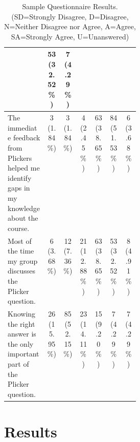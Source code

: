 \documentclass[12pt]{article}
\begin{document}
\begin{table}[ht]
\begin{tabular}{p{0.30\linewidth} |c|c|c|c|c|c}
& \specialcell{  53 \\(32.52\%)  }
& \specialcell{  7 \\(4.29\%)}\\\midrule 
\rowcolor{LightGray}%
The immediate feedback from Plickers helped me identify gaps in my knowledge about the course. 
& \specialcell{3 \\(1.84\%) }
& \specialcell{  3 \\(1.84\%)  }
& \specialcell{  4 \\(2.45\%)  }
& \specialcell{  63\\ (38.65\%) }
& \specialcell{  84 \\(51.53\%) }
& \specialcell{  6 \\(3.68\%)}\\\midrule 
Most of the time my group discusses the Plicker question.  
& \specialcell{6 \\(3.68\%) }
& \specialcell{  12 \\(7.36\%) }
& \specialcell{  21\\ (12.88\%) }
& \specialcell{  63 \\(38.65\%) }
& \specialcell{  53 \\(32.52\%) }
& \specialcell{  8 \\(4.91\%)}\\\midrule 
\rowcolor{LightGray} %
Knowing the right answer is the only important part of the Plicker question. 
& \specialcell{26 \\(15.95\%) }
& \specialcell{  85 \\(52.15\%) }
& \specialcell{  23\\ (14.11\%) }
& \specialcell{15 \\(9.20\%)}
& \specialcell{  7 \\(4.29\%)  }
& \specialcell{7 \\(4.29\%)}
\\\bottomrule
\end{tabular}
\label{table:questionnairesummary}
\caption{Sample Questionnaire Results.\\\hspace{\textwidth}(SD=Strongly Disagree, D=Disagree, N=Neither Disagree nor Agree, A=Agree, \\ SA=Strongly Agree, U=Unanswered)}
\end{table}
\restoregeometry

\section{Results}
\end{document}
